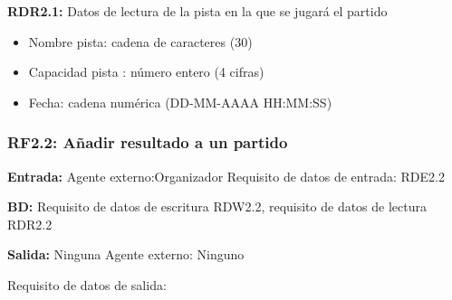 \textbf{RDR2.1:} Datos de lectura de la pista en la que se jugará el partido
\begin{itemize}
	\item Nombre pista: cadena de caracteres (30)
	\item Capacidad pista : número entero (4 cifras)
	\item Fecha: cadena numérica (DD-MM-AAAA HH:MM:SS)
\end{itemize}

\subsubsection{RF2.2: Añadir resultado a un partido}
\textbf{Entrada:} Agente externo:Organizador    Requisito de datos de entrada: RDE2.2

\textbf{BD:} Requisito de datos de  escritura RDW2.2, requisito de datos de lectura RDR2.2

\textbf{Salida:} Ninguna   Agente externo: Ninguno

Requisito de datos de salida:

